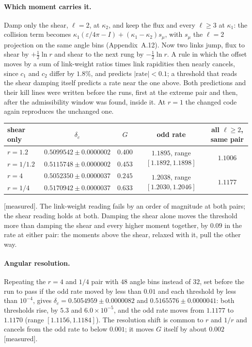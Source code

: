 \documentclass[11pt]{article}
\newcommand{\grade}[1]{\textsf{\small[#1]}}
\begin{document}
\paragraph{Which moment carries it.} Damp only the shear, $\ell=2$, at $\kappa_2$, and keep the flux and every $\ell\ge3$ at $\kappa_1$: the collision term becomes $\kappa_1(\varepsilon/4\pi-I)+(\kappa_1-\kappa_2)s_\mu$, with $s_\mu$ the $\ell=2$ projection on the same angle bins (Appendix~A.12). Now two links jump, flux to shear by $+\tfrac12\ln r$ and shear to the next rung by $-\tfrac12\ln r$. A rule in which the offset moves by a sum of link-weight ratios times link rapidities then nearly cancels, since $c_1$ and $c_2$ differ by $1.8\%$, and predicts $|\text{rate}|<0.1$; a threshold that reads the shear damping itself predicts a rate near the one above. Both predictions and their kill lines were written before the runs, first at the extreme pair and then, after the admissibility window was found, inside it. At $r=1$ the changed code again reproduces the unchanged one.
\begin{center}\begin{tabular}{lcccc}\toprule
shear only & $\delta_c$ & $G$ & odd rate & all $\ell\ge2$, same pair\\\midrule
$r=1.2$ & $0.5099542\pm0.0000002$ & $0.400$ & \multirow{2}{*}{$1.1895$, range $[1.1892,1.1898]$} & \multirow{2}{*}{$1.1006$}\\
$r=1/1.2$ & $0.5115748\pm0.0000002$ & $0.453$ & & \\\midrule
$r=4$ & $0.5052350\pm0.0000037$ & $0.245$ & \multirow{2}{*}{$1.2038$, range $[1.2030,1.2046]$} & \multirow{2}{*}{$1.1177$}\\
$r=1/4$ & $0.5170942\pm0.0000037$ & $0.633$ & & \\\bottomrule\end{tabular}\end{center}
\grade{measured}. The link-weight reading fails by an order of magnitude at both pairs; the shear reading holds at both. Damping the shear alone moves the threshold more than damping the shear and every higher moment together, by $0.09$ in the rate at either pair: the moments above the shear, relaxed with it, pull the other way.

\paragraph{Angular resolution.} Repeating the $r=4$ and $1/4$ pair with $48$ angle bins instead of $32$, set before the run to pass if the odd rate moved by less than $0.01$ and each threshold by less than $10^{-4}$, gives $\delta_c=0.5054959\pm0.0000082$ and $0.5165576\pm0.0000041$: both thresholds rise, by $5.3$ and $6.0\times10^{-5}$, and the odd rate moves from $1.1177$ to $1.1170$ (range $[1.1156,1.1184]$). The resolution shift is common to $r$ and $1/r$ and cancels from the odd rate to below $0.001$; it moves $G$ itself by about $0.002$ \grade{measured}.
\end{document}
